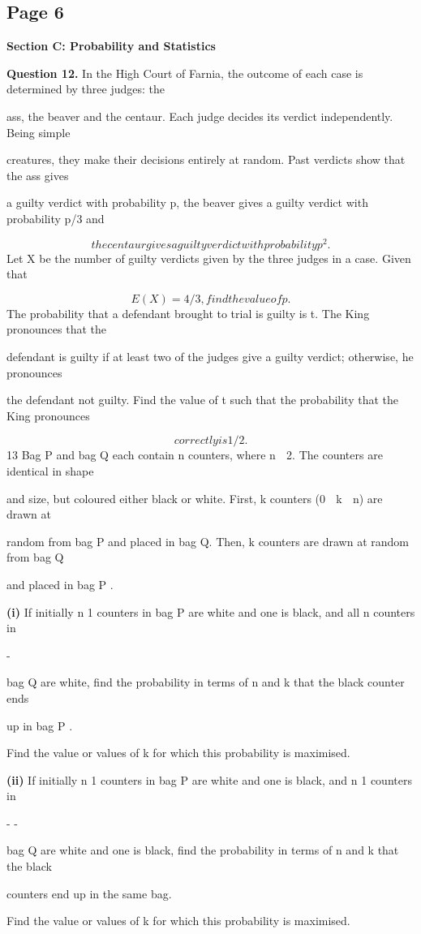 \documentclass[12pt]{article}
\begin{document}
\subsection*{Page 6}
\begin{flushleft}
\bigskip\textbf{Section C: Probability and Statistics}\par
\bigskip\textbf{Question 12.} In the High Court of Farnia, the outcome of each case is determined by three judges: the\par
ass, the beaver and the centaur. Each judge decides its verdict independently. Being simple\par
creatures, they make their decisions entirely at random. Past verdicts show that the ass gives\par
a guilty verdict with probability p, the beaver gives a guilty verdict with probability p/3 and\par
\[the centaur gives a guilty verdict with probability p^2.\]
Let X be the number of guilty verdicts given by the three judges in a case. Given that\par
\[E(X) = 4/3, find the value of p.\]
The probability that a defendant brought to trial is guilty is t. The King pronounces that the\par
defendant is guilty if at least two of the judges give a guilty verdict; otherwise, he pronounces\par
the defendant not guilty. Find the value of t such that the probability that the King pronounces\par
\[correctly is 1/2.\]
13 Bag P and bag Q each contain n counters, where n  2. The counters are identical in shape\par
and size, but coloured either black or white. First, k counters (0  k  n) are drawn at\par
random from bag P and placed in bag Q. Then, k counters are drawn at random from bag Q\par
and placed in bag P .\par
\textbf{(i)} If initially n 1 counters in bag P are white and one is black, and all n counters in\par
-\par
bag Q are white, find the probability in terms of n and k that the black counter ends\par
up in bag P .\par
Find the value or values of k for which this probability is maximised.\par
\textbf{(ii)} If initially n 1 counters in bag P are white and one is black, and n 1 counters in\par
- -\par
bag Q are white and one is black, find the probability in terms of n and k that the black\par
counters end up in the same bag.\par
Find the value or values of k for which this probability is maximised.\par
\end{flushleft}
\end{document}
